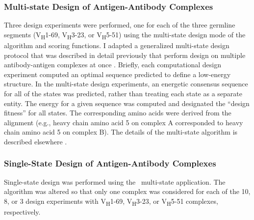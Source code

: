 \subsubsection{Multi-state Design of Antigen-Antibody Complexes}
Three design experiments were performed, one for each of the three germline segments (V\textsubscript{H}1-69, V\textsubscript{H}3-23, or V\textsubscript{H}5-51) using the multi-state design mode of the \rosetta algorithm and scoring functions. I adapted a generalized multi-state design protocol that was described in detail previously that perform design on multiple antibody-antigen complexes at once \citep{LeaverFay:2011ji}. Briefly, each computational design experiment computed an optimal sequence predicted to define a low-energy structure.  In the multi-state design experiments, an energetic consensus sequence for all of the states was predicted, rather than treating each state as a separate entity. The energy for a given sequence was computed and designated the ``design fitness'' for all states. The corresponding amino acids were derived from the alignment (e.g., heavy chain amino acid 5 on complex A corresponded to heavy chain amino acid 5 on complex B). The details of the multi-state algorithm is described elsewhere \citep{LeaverFay:2011ji}.

\subsubsection{Single-State Design of Antigen-Antibody Complexes}
Single-state design was performed using the \rosetta~multi-state application. The algorithm was altered so that only one complex was considered for each of the 10, 8, or 3 design experiments with V\textsubscript{H}1-69, V\textsubscript{H}3-23, or V\textsubscript{H}5-51 complexes, respectively.

